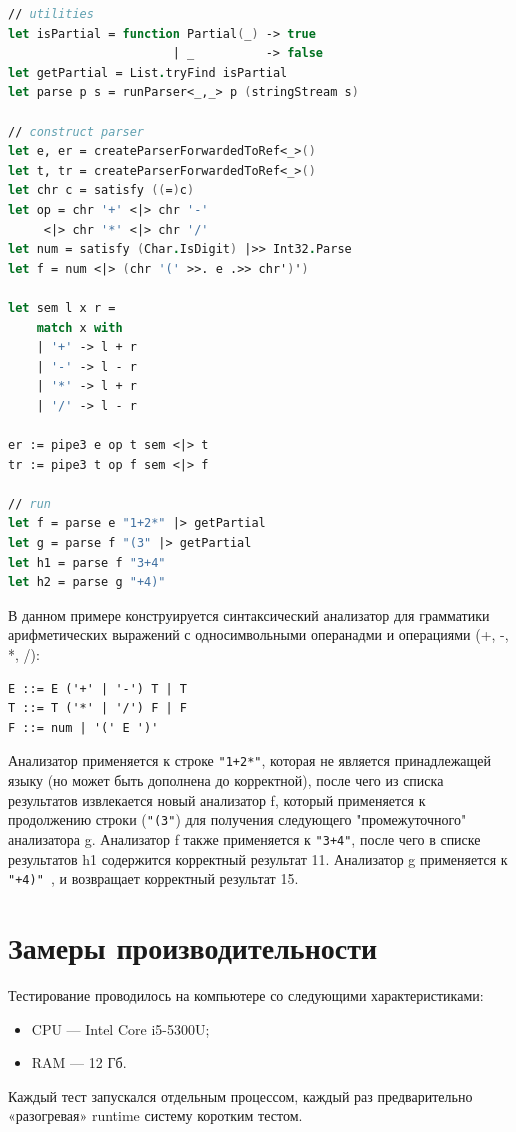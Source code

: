 \documentclass[14pt]{matmex-diploma}
\begin{document}
\begin{lstlisting}[language=FSharp]
// utilities
let isPartial = function Partial(_) -> true 
                       | _          -> false
let getPartial = List.tryFind isPartial
let parse p s = runParser<_,_> p (stringStream s)

// construct parser
let e, er = createParserForwardedToRef<_>()
let t, tr = createParserForwardedToRef<_>()
let chr c = satisfy ((=)c) 
let op = chr '+' <|> chr '-' 
     <|> chr '*' <|> chr '/'
let num = satisfy (Char.IsDigit) |>> Int32.Parse
let f = num <|> (chr '(' >>. e .>> chr')')

let sem l x r = 
    match x with 
    | '+' -> l + r 
    | '-' -> l - r
    | '*' -> l + r 
    | '/' -> l - r
    
er := pipe3 e op t sem <|> t
tr := pipe3 t op f sem <|> f

// run
let f = parse e "1+2*" |> getPartial 
let g = parse f "(3" |> getPartial
let h1 = parse f "3+4"
let h2 = parse g "+4)"
\end{lstlisting}

В данном примере конструируется синтаксический анализатор для грамматики арифметических выражений 
с односимвольными операнадми и операциями (+, -, *, /):
\begin{lstlisting}
E ::= E ('+' | '-') T | T
T ::= T ('*' | '/') F | F
F ::= num | '(' E ')' 
\end{lstlisting}
Анализатор применяется к строке {\tt "1+2*"}, которая не является принадлежащей языку 
  (но может быть дополнена до корректной), после чего из списка результатов 
  извлекается новый анализатор f, который применяется к продолжению строки 
  ({\tt "(3"}) для получения следующего "промежуточного" анализатора g. Анализатор f также
  применяется к {\tt "3+4"}, после чего в списке результатов h1 содержится корректный
  результат 11. Анализатор g применяется к {\tt "+4)" }, и возвращает корректный результат 15.






\section{Замеры производительности}

Тестирование проводилось на компьютере со следующими характеристиками:
\begin{itemize}
    \item CPU --- Intel Core i5-5300U;
    \item RAM --- 12 Гб.
\end{itemize}
Каждый тест запускался отдельным процессом, каждый раз предварительно «разогревая» runtime 
систему коротким тестом.\\
\end{document}

